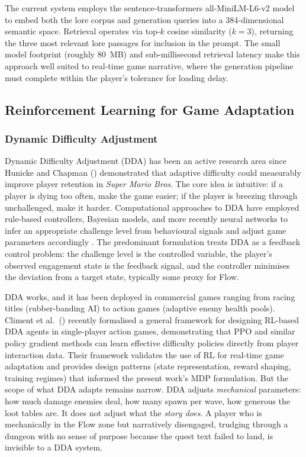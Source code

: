 The current system employs the sentence-transformers all-MiniLM-L6-v2 model \citep{wang2020minilm} to embed both the lore corpus and generation queries into a 384-dimensional semantic space. Retrieval operates via top-$k$ cosine similarity ($k = 3$), returning the three most relevant lore passages for inclusion in the prompt. The small model footprint (roughly 80~MB) and sub-millisecond retrieval latency make this approach well suited to real-time game narrative, where the generation pipeline must complete within the player's tolerance for loading delay.

\subsection{Reinforcement Learning for Game Adaptation}

\subsubsection{Dynamic Difficulty Adjustment}

Dynamic Difficulty Adjustment (DDA) has been an active research area since Hunicke and Chapman (\citeyear{hunicke2004ai}) demonstrated that adaptive difficulty could measurably improve player retention in \textit{Super Mario Bros}. The core idea is intuitive: if a player is dying too often, make the game easier; if the player is breezing through unchallenged, make it harder. Computational approaches to DDA have employed rule-based controllers, Bayesian models, and more recently neural networks to infer an appropriate challenge level from behavioural signals and adjust game parameters accordingly \citep{lopes2017adaptive}. The predominant formulation treats DDA as a feedback control problem: the challenge level is the controlled variable, the player's observed engagement state is the feedback signal, and the controller minimises the deviation from a target state, typically some proxy for Flow.

DDA works, and it has been deployed in commercial games ranging from racing titles (rubber-banding AI) to action games (adaptive enemy health pools). Climent et al.\ (\citeyear{climent2024framework}) recently formalised a general framework for designing RL-based DDA agents in single-player action games, demonstrating that PPO and similar policy gradient methods can learn effective difficulty policies directly from player interaction data. Their framework validates the use of RL for real-time game adaptation and provides design patterns (state representation, reward shaping, training regimes) that informed the present work's MDP formulation. But the scope of what DDA adapts remains narrow. DDA adjusts \textit{mechanical} parameters: how much damage enemies deal, how many spawn per wave, how generous the loot tables are. It does not adjust what the \textit{story does}. A player who is mechanically in the Flow zone but narratively disengaged, trudging through a dungeon with no sense of purpose because the quest text failed to land, is invisible to a DDA system.

